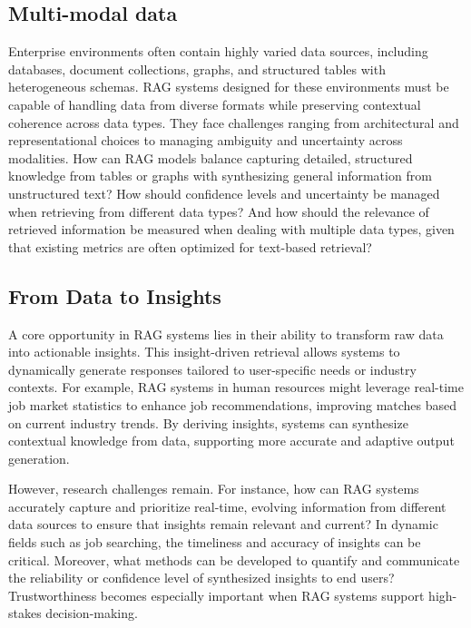 \subsection{Multi-modal data}
Enterprise environments often contain highly varied data sources, including databases, document collections, graphs, and structured tables with heterogeneous schemas. RAG systems designed for these environments must be capable of handling data from diverse formats while preserving contextual coherence across data types. They face challenges ranging from architectural and representational choices to managing ambiguity and uncertainty across modalities. How can RAG models balance capturing detailed, structured knowledge from tables or graphs with synthesizing general information from unstructured text? How should confidence levels and uncertainty be managed when retrieving from different data types? And how should the relevance of retrieved information be measured when dealing with multiple data types, given that existing metrics are often optimized for text-based retrieval?

\subsection{From Data to Insights}
A core opportunity in RAG systems lies in their ability to transform raw data into actionable insights. This insight-driven retrieval allows systems to dynamically generate responses tailored to user-specific needs or industry contexts. For example, RAG systems in human resources might leverage real-time job market statistics to enhance job recommendations, improving matches based on current industry trends. By deriving insights, systems can synthesize contextual knowledge from data, supporting more accurate and adaptive output generation.

However, research challenges remain. For instance, how can RAG systems accurately capture and prioritize real-time, evolving information from different data sources to ensure that insights remain relevant and current? In dynamic fields such as job searching, the timeliness and accuracy of insights can be critical. Moreover, what methods can be developed to quantify and communicate the reliability or confidence level of synthesized insights to end users? Trustworthiness becomes especially important when RAG systems support high-stakes decision-making.

